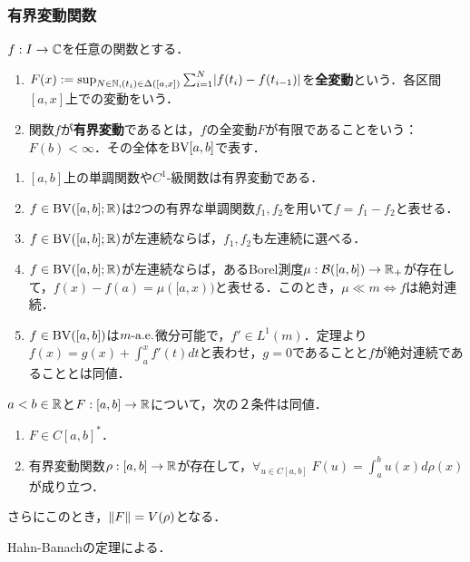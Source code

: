 \documentclass[uplatex,dvipdfmx]{jsreport}
\begin{document}
\subsubsection{有界変動関数}

\begin{definition}
    $f:I\to\mathbb{C}$を任意の関数とする．
    \begin{enumerate}
        \item $F(x):=\sup_{N\in\mathbb{N},(t_i)\in\Delta([a,x])}\sum^N_{i=1}\lvert f(t_i)-f(t_{i-1})\rvert$を\textbf{全変動}という．各区間$[a,x]$上での変動をいう．
        \item 関数$f$が\textbf{有界変動}であるとは，$f$の全変動$F$が有限であることをいう：$F(b)<\infty$．その全体を$\mathrm{BV}[a,b]$で表す．
    \end{enumerate}
\end{definition}

\begin{proposition}[有界変動関数の性質]\mbox{}
    \begin{enumerate}
        \item $[a,b]$上の単調関数や$C^1$-級関数は有界変動である．
        \item $f\in\mathrm{BV}([a,b];\mathbb{R})$は2つの有界な単調関数$f_1,f_2$を用いて$f=f_1-f_2$と表せる．
        \item $f\in\mathrm{BV}([a,b];\mathbb{R})$が左連続ならば，$f_1,f_2$も左連続に選べる．
        \item $f\in\mathrm{BV}([a,b];\mathbb{R})$が左連続ならば，あるBorel測度$\mu:\mathcal{B}([a,b])\to\mathbb{R}_+$が存在して，$f(x)-f(a)=\mu([a,x))$と表せる．このとき，$\mu\ll m\Leftrightarrow f$は絶対連続．
        \item $f\in\mathrm{BV}([a,b])$は$m\text{-a.e.}$微分可能で，$f'\in L^1(m)$．定理より$f(x)=g(x)+\int_a^xf'(t)dt$と表わせ，$g=0$であることと$f$が絶対連続であることとは同値．
    \end{enumerate}
\end{proposition}

\begin{theorem}[有界閉区間上の連続関数の空間の双対空間]
    $a<b\in\mathbb{R}$と$F:[a,b]\to\mathbb{R}$について，次の２条件は同値．
    \begin{enumerate}
        \item $F\in C[a,b]^*$．
        \item 有界変動関数$\rho:[a,b]\to\mathbb{R}$が存在して，$\forall_{u\in C[a,b]}\;F(u)=\int^b_au(x)d\rho(x)$が成り立つ．
    \end{enumerate}
    さらにこのとき，$\|F\|=V(\rho)$となる．
\end{theorem}
\begin{Proof}
    Hahn-Banachの定理による．
\end{Proof}
\end{document}
